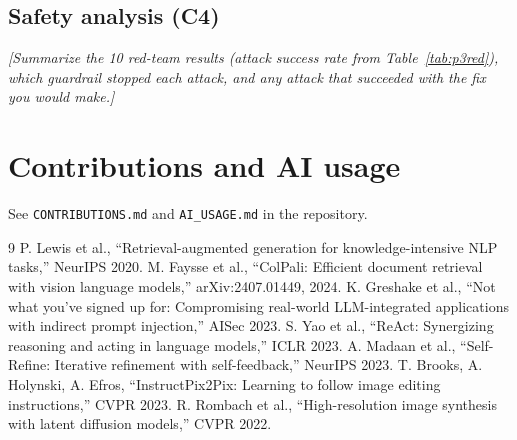 \documentclass[conference]{IEEEtran}
\newcommand{\todo}[1]{\textit{[#1]}}
\begin{document}
\subsection{Safety analysis (C4)}\label{sec:p2safety}
\todo{Summarize the 10 red-team results (attack success rate from Table~\ref{tab:p3red}), which guardrail stopped each
attack, and any attack that succeeded with the fix you would make.}

\section*{Contributions and AI usage}
See \texttt{CONTRIBUTIONS.md} and \texttt{AI\_USAGE.md} in the repository.

\begin{thebibliography}{9}
 P. Lewis et al., ``Retrieval-augmented generation for knowledge-intensive NLP tasks,'' NeurIPS 2020.
 M. Faysse et al., ``ColPali: Efficient document retrieval with vision language models,'' arXiv:2407.01449, 2024.
 K. Greshake et al., ``Not what you've signed up for: Compromising real-world LLM-integrated applications with indirect prompt injection,'' AISec 2023.
 S. Yao et al., ``ReAct: Synergizing reasoning and acting in language models,'' ICLR 2023.
 A. Madaan et al., ``Self-Refine: Iterative refinement with self-feedback,'' NeurIPS 2023.
 T. Brooks, A. Holynski, A. Efros, ``InstructPix2Pix: Learning to follow image editing instructions,'' CVPR 2023.
 R. Rombach et al., ``High-resolution image synthesis with latent diffusion models,'' CVPR 2022.
\end{thebibliography}
\end{document}
